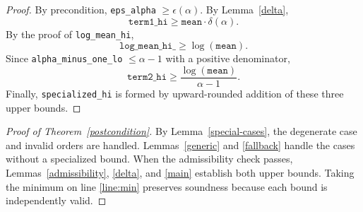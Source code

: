 \documentclass{article}
\begin{document}
\begin{proof}
By precondition, \texttt{eps\_alpha} $\ge \epsilon(\alpha)$.
By Lemma~\ref{delta},
\[
\texttt{term1\_hi} \ge \texttt{mean}\cdot \delta(\alpha).
\]
By the proof of \texttt{log\_mean\_hi},
\[
\texttt{log\_mean\_hi\_} \ge \log(\texttt{mean}).
\]
Since \texttt{alpha\_minus\_one\_lo} $\le \alpha - 1$ with a positive denominator,
\[
\texttt{term2\_hi} \ge \frac{\log(\texttt{mean})}{\alpha - 1}.
\]
Finally, \texttt{specialized\_hi} is formed by upward-rounded addition
of these three upper bounds.
\end{proof}

\begin{proof}[Proof of Theorem~\ref{postcondition}]
By Lemma~\ref{special-cases}, the degenerate case and invalid orders
are handled. Lemmas~\ref{generic} and \ref{fallback} handle the cases
without a specialized bound. When the admissibility check passes,
Lemmas~\ref{admissibility}, \ref{delta}, and \ref{main} establish both
upper bounds. Taking the minimum on line \ref{line:min} preserves
soundness because each bound is independently valid.
\end{proof}
\end{document}
